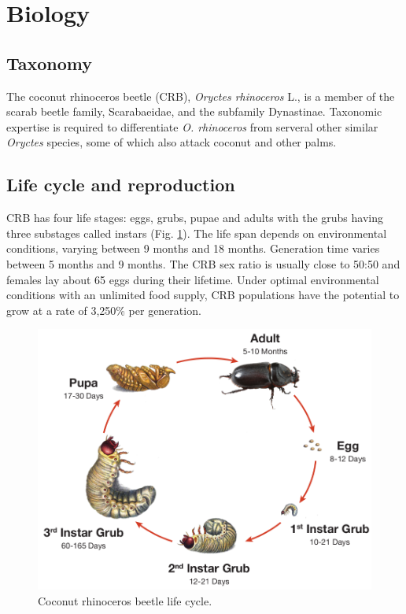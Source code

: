 \documentclass[twocolumn,letterpaper]{scrartcl}
\begin{document}
\section{Biology}

\subsection{Taxonomy}

The coconut rhinoceros beetle (CRB), \textit{Oryctes rhinoceros} L., is a member of the scarab beetle  family, Scarabaeidae, and the subfamily Dynastinae. Taxonomic expertise is required to differentiate \textit{O. rhinoceros} from serveral other similar \textit{Oryctes} species, some of which also attack coconut and other palms.


\subsection{Life cycle and reproduction}
CRB has four life stages: eggs, grubs, pupae and adults with the grubs having three substages called instars (Fig. \ref{fig:crblifecycle}). The life span depends on environmental conditions, varying between 9 months and 18 months. Generation time varies between 5 months and 9 months.
The CRB sex ratio is usually close to 50:50 and females lay about 65 eggs during their lifetime. Under optimal environmental conditions with an unlimited food supply, CRB populations have the potential to grow at a rate of 3,250\% per generation.

\begin{figure}[h!]
	\centering
	\includegraphics[width=\linewidth]{images/crb_life_cycle}
	\caption{Coconut rhinoceros beetle life cycle.}
	\label{fig:crblifecycle}
\end{figure}
\end{document}
